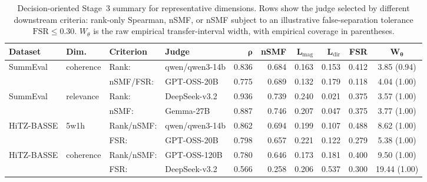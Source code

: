 \begin{table}[t]
\centering
\scriptsize
\setlength{\tabcolsep}{2.6pt}
\caption{
Decision-oriented Stage~3 summary for representative dimensions. Rows show the judge selected by different downstream criteria: rank-only Spearman, nSMF, or nSMF subject to an illustrative false-separation tolerance $\mathrm{FSR}\le 0.30$. $W_\theta$ is the raw empirical transfer-interval width, with empirical coverage in parentheses.
}
\label{tab:stage3-decision-summary}
\begin{tabular}{ll l l rrrrr c}
\toprule
\textbf{Dataset} & \textbf{Dim.} & \textbf{Criterion} & \textbf{Judge} & $\boldsymbol{\rho}$ & \textbf{nSMF} & $\mathbf{L_{\mathrm{mag}}}$ & $\mathbf{L_{\mathrm{dir}}}$ & \textbf{FSR} & $\boldsymbol{W_{\theta}}$ \\
\midrule
SummEval & coherence & Rank: & qwen/qwen3-14b & 0.836 & 0.684 & 0.163 & 0.153 & 0.412 & 3.85 (0.94) \\
 &  & nSMF/FSR: & GPT-OSS-20B & 0.775 & 0.689 & 0.132 & 0.179 & 0.118 & 4.04 (1.00) \\
\midrule
SummEval & relevance & Rank: & DeepSeek-v3.2 & 0.936 & 0.739 & 0.240 & 0.021 & 0.375 & 3.57 (1.00) \\
 &  & nSMF: & Gemma-27B & 0.887 & 0.746 & 0.207 & 0.047 & 0.375 & 3.77 (1.00) \\
\midrule
HiTZ-BASSE & 5w1h & Rank/nSMF: & qwen/qwen3-14b & 0.862 & 0.694 & 0.199 & 0.107 & 0.488 & 8.62 (1.00) \\
 &  & FSR: & GPT-OSS-20B & 0.798 & 0.657 & 0.221 & 0.122 & 0.279 & 5.38 (1.00) \\
\midrule
HiTZ-BASSE & coherence & Rank/nSMF: & GPT-OSS-120B & 0.780 & 0.646 & 0.173 & 0.181 & 0.400 & 9.50 (1.00) \\
 &  & FSR: & DeepSeek-v3.2 & 0.566 & 0.258 & 0.206 & 0.537 & 0.300 & 19.44 (1.00) \\
\bottomrule
\end{tabular}
\end{table}